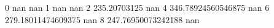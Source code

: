 0 nan nan
1 nan nan
2 235.20703125 nan
4 346.78924560546875 nan
6 279.18011474609375 nan
8 247.76950073242188 nan
